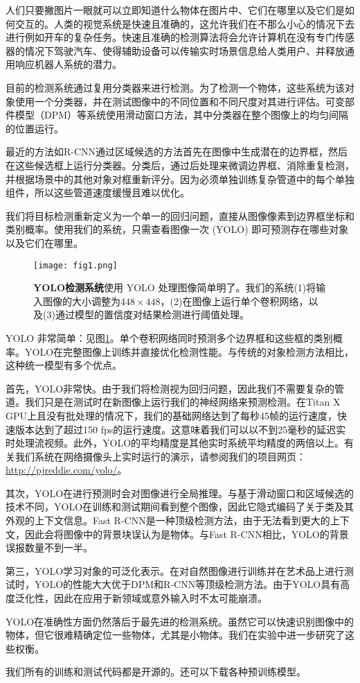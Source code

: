 \documentclass[../main.tex]{subfile}
\begin{document}
人们只要撇图片一眼就可以立即知道什么物体在图片中、它们在哪里以及它们是如何交互的。人类的视觉系统是快速且准确的，这允许我们在不那么小心的情况下去进行例如开车的复杂任务。快速且准确的检测算法将会允许计算机在没有专门传感器的情况下驾驶汽车、使得辅助设备可以传输实时场景信息给人类用户、并释放通用响应机器人系统的潜力。

目前的检测系统通过复用分类器来进行检测。为了检测一个物体，这些系统为该对象使用一个分类器，并在测试图像中的不同位置和不同尺度对其进行评估。可变部件模型（DPM）等系统使用滑动窗口方法，其中分类器在整个图像上的均匀间隔的位置运行\cite{dpm}。

最近的方法如R-CNN通过区域候选的方法首先在图像中生成潜在的边界框，然后在这些候选框上运行分类器。分类后，通过后处理来微调边界框、消除重复检测，并根据场景中的其他对象对框重新评分\cite{rcnn}。因为必须单独训练复杂管道中的每个单独组件，所以这些管道速度缓慢且难以优化。

我们将目标检测重新定义为一个单一的回归问题，直接从图像像素到边界框坐标和类别概率。使用我们的系统，只需查看图像一次 (YOLO) 即可预测存在哪些对象以及它们在哪里。

\begin{figure}[htb]
    \centering
    \texttt{[image: fig1.png]}
    \caption{\textbf{YOLO检测系统}使用 YOLO 处理图像简单明了。我们的系统(1)将输入图像的大小调整为$ 448 \times 448$，(2)在图像上运行单个卷积网络，以及(3)通过模型的置信度对结果检测进行阈值处理。}
    \label{fig:fig1}
\end{figure}

YOLO 非常简单：见图\ref{fig:fig1}。单个卷积网络同时预测多个边界框和这些框的类别概率。YOLO在完整图像上训练并直接优化检测性能。与传统的对象检测方法相比，这种统一模型有多个优点。

首先，YOLO非常快。由于我们将检测视为回归问题，因此我们不需要复杂的管道。我们只是在测试时在新图像上运行我们的神经网络来预测检测。在Titan X GPU上且没有批处理的情况下，我们的基础网络达到了每秒45帧的运行速度，快速版本达到了超过150 fps的运行速度。这意味着我们可以以不到25毫秒的延迟实时处理流视频。此外，YOLO的平均精度是其他实时系统平均精度的两倍以上。有关我们系统在网络摄像头上实时运行的演示，请参阅我们的项目网页：\href{http://pjreddie.com/yolo/}{http://pjreddie.com/yolo/}。

其次，YOLO在进行预测时会对图像进行全局推理。与基于滑动窗口和区域候选的技术不同，YOLO在训练和测试期间看到整个图像，因此它隐式编码了关于类及其外观的上下文信息。Fast R-CNN是一种顶级检测方法\cite{fastrcnn}，由于无法看到更大的上下文，因此会将图像中的背景块误认为是物体。与Fast R-CNN相比，YOLO的背景误报数量不到一半。

第三，YOLO学习对象的可泛化表示。在对自然图像进行训练并在艺术品上进行测试时，YOLO的性能大大优于DPM和R-CNN等顶级检测方法。由于YOLO具有高度泛化性，因此在应用于新领域或意外输入时不太可能崩溃。

YOLO在准确性方面仍然落后于最先进的检测系统。虽然它可以快速识别图像中的物体，但它很难精确定位一些物体，尤其是小物体。我们在实验中进一步研究了这些权衡。

我们所有的训练和测试代码都是开源的。还可以下载各种预训练模型。
\end{document}
